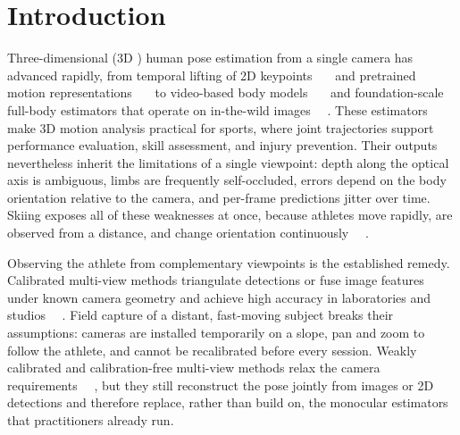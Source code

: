 \documentclass[preprint,12pt]{elsarticle}
\providecommand{\DIFaddbegin}{} %
\providecommand{\DIFaddend}{} %
\providecommand{\DIFadd}[1]{{\protect\color{blue}#1}} %
\begin{document}
\linenumbers

\section{Introduction}

 \DIFaddbegin \DIFadd{Three-dimensional (}\DIFaddend 3D \DIFaddbegin \DIFadd{) human pose estimation from a single camera has advanced rapidly, from temporal lifting of 2D keypoints~\mbox{%
\cite{pavllo2019videopose3d,zheng2021poseformer,li2022mhformer} }\hskip0pt%
and pretrained motion representations~\mbox{%
\cite{zhu2023motionbert} }\hskip0pt%
to video-based body models~\mbox{%
\cite{kocabas2020vibe} }\hskip0pt%
and foundation-scale full-body estimators that operate on in-the-wild images~\mbox{%
\cite{yang2026sam}}\hskip0pt%
. These estimators make 3D motion analysis practical for sports, where joint trajectories support performance evaluation, skill assessment, and injury prevention. Their outputs nevertheless inherit the limitations of a single viewpoint: depth along the optical axis is ambiguous, limbs are frequently self-occluded, errors depend on the body orientation relative to the camera, and per-frame predictions jitter over time. Skiing exposes all of these weaknesses at once, because athletes move rapidly, are observed from a distance, and change orientation continuously~\mbox{%
\cite{rhodin2018learning,chen2021sportscap}}\hskip0pt%
}\DIFaddend .

 \DIFaddbegin \DIFadd{Observing the athlete from complementary viewpoints is the established remedy. }\DIFaddend Calibrated multi-view  \DIFaddbegin \DIFadd{methods triangulate detections or fuse image features under known camera geometry and achieve high accuracy in laboratories and studios~\mbox{%
\cite{nogueira2025survey,iskakov2019learnable,he2020epipolar,liao2024multiple,zhang2021adafuse}}\hskip0pt%
. Field capture of a distant, fast-moving subject breaks their assumptions: cameras }\DIFaddend are installed temporarily  \DIFaddbegin \DIFadd{on a slope, pan and zoom to follow the athlete, and cannot be recalibrated before every session. Weakly calibrated and }\DIFaddend calibration-free  \DIFaddbegin \DIFadd{multi-view methods relax the camera requirements~\mbox{%
\cite{usman2022metapose,gordon2022flex}}\hskip0pt%
, but they still reconstruct the pose jointly from images or 2D detections and therefore replace, rather than build on, the monocular estimators that practitioners already run.
}
\end{document}
